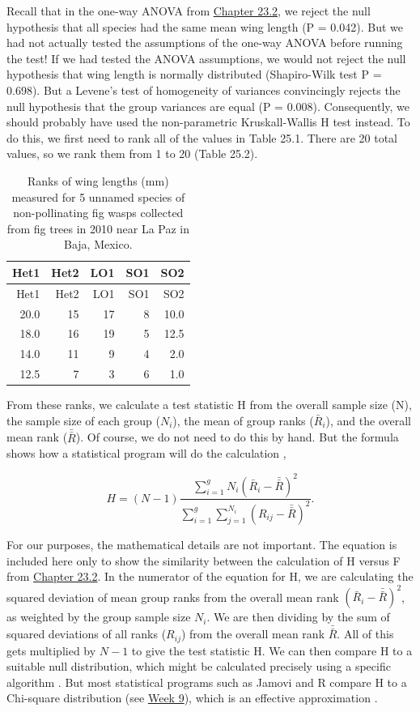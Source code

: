 \documentclass[
]{scrbook}
\begin{document}
Recall that in the one-way ANOVA from \protect\hyperlink{one-way-anova}{Chapter 23.2}, we reject the null hypothesis that all species had the same mean wing length (P = 0.042).
But we had not actually tested the assumptions of the one-way ANOVA before running the test!
If we had tested the ANOVA assumptions, we would not reject the null hypothesis that wing length is normally distributed (Shapiro-Wilk test P = 0.698).
But a Levene's test of homogeneity of variances convincingly rejects the null hypothesis that the group variances are equal (P = 0.008).
Consequently, we should probably have used the non-parametric Kruskall-Wallis H test instead.
To do this, we first need to rank all of the values in Table 25.1.
There are 20 total values, so we rank them from 1 to 20 (Table 25.2).

\begin{longtable}[]{@{}rrrrr@{}}
\caption{\label{tab:unnamed-chunk-117}Ranks of wing lengths (mm) measured for 5 unnamed species of non-pollinating fig wasps collected from fig trees in 2010 near La Paz in Baja, Mexico.}\tabularnewline
\toprule
Het1 & Het2 & LO1 & SO1 & SO2 \\
\midrule
\endfirsthead
\toprule
Het1 & Het2 & LO1 & SO1 & SO2 \\
\midrule
\endhead
20.0 & 15 & 17 & 8 & 10.0 \\
18.0 & 16 & 19 & 5 & 12.5 \\
14.0 & 11 & 9 & 4 & 2.0 \\
12.5 & 7 & 3 & 6 & 1.0 \\
\bottomrule
\end{longtable}

From these ranks, we calculate a test statistic H from the overall sample size (N), the sample size of each group (\(N_{i}\)), the mean of group ranks (\(\bar{R}_{i}\)), and the overall mean rank (\(\bar{\bar R}\)).
Of course, we do not need to do this by hand.
But the formula shows how a statistical program will do the calculation \citep{Kruskal1952a},

\[H = (N - 1) \frac{\sum_{i=1}^{g}N_{i}\left(\bar{R}_{i} - \bar{\bar R} \right)^2}{\sum_{i=1}^{g}\sum_{j=1}^{N_{i}} \left(R_{ij} - \bar{\bar R} \right)^{2}}.\]

For our purposes, the mathematical details are not important.
The equation is included here only to show the similarity between the calculation of H versus F from \protect\hyperlink{one-way-anova}{Chapter 23.2}.
In the numerator of the equation for H, we are calculating the squared deviation of mean group ranks from the overall mean rank \((\bar{R}_{i} - \bar{\bar R})^2\), as weighted by the group sample size \(N_{i}\).
We are then dividing by the sum of squared deviations of all ranks (\(R_{ij}\)) from the overall mean rank \(\bar{\bar R}\).
All of this gets multiplied by \(N - 1\) to give the test statistic H.
We can then compare H to a suitable null distribution, which might be calculated precisely using a specific algorithm \citep[e.g.,][]{Choi2003}.
But most statistical programs such as Jamovi and R compare H to a Chi-square distribution (see \protect\hyperlink{Week9}{Week 9}), which is an effective approximation \citep{Miller2004}.
\end{document}
